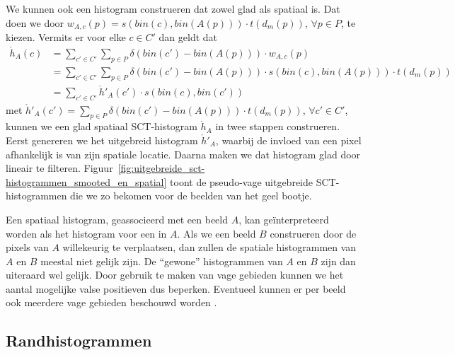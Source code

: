 We kunnen ook een histogram construeren dat zowel glad als spatiaal is. Dat doen we door
$w_{A,c}(p)=s(bin(c),bin(A(p))) \cdot t(d_m(p))$, $\forall p \in P$, te kiezen. 
Vermits er voor elke $c \in C'$ dan geldt dat
\begin{align*}
\mathring{h}_A(c) 
 &= \displaystyle \sum_{c' \in C'} \sum_{p \in P} \delta (bin(c')-bin(A(p))) \cdot w_{A,c}(p) \\
 &= \displaystyle \sum_{c' \in C'} \sum_{p \in P} \delta (bin(c')-bin(A(p))) \cdot s(bin(c),bin(A(p))) \cdot t(d_m(p)) \\
 &= \displaystyle \sum_{c' \in C'} \mathring{h}'_A(c') \cdot s(bin(c),bin(c'))
\end{align*}
met $\mathring{h}'_A(c')=\sum_{p \in P} \delta (bin(c')-bin(A(p))) \cdot t(d_m(p))$, $\forall c' \in C'$, 
kunnen we een glad spatiaal SCT-histogram $\mathring{h}_A$ in twee stappen construeren. Eerst
genereren we het uitgebreid histogram $\mathring{h}'_A$, waarbij de invloed van een pixel 
afhankelijk is van zijn spatiale locatie. Daarna maken we dat histogram glad door lineair te 
filteren. Figuur~\ref{fig:uitgebreide_sct-histogrammen_smooted_en_spatial} toont de
pseudo-vage uitgebreide SCT-histogrammen die we zo bekomen voor de beelden van het geel
bootje. 
 
Een spatiaal histogram, geassocieerd met een beeld $A$, kan ge\"interpreteerd worden als het 
histogram voor een  in $A$. Als we een beeld $B$ construeren door de pixels
van $A$ willekeurig te verplaatsen, dan zullen de spatiale histogrammen van $A$ en $B$
meestal niet gelijk zijn. De ``gewone'' histogrammen van $A$ en $B$ zijn dan uiteraard wel gelijk. 
Door gebruik te maken van vage gebieden kunnen we het aantal mogelijke
valse positieven dus beperken. Eventueel kunnen er per beeld ook meerdere vage gebieden beschouwd
worden \cite{stricker:fuzzy_regions_for_image_indexing}.
 
\subsection{Randhistogrammen} 
 
